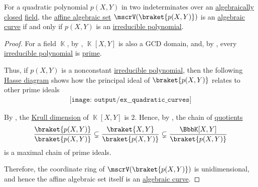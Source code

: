 \begin{proposition}\label{thm:quadratic_polynomial_irreducibility}
  For a quadratic polynomial \( p(X, Y) \) in two indeterminates over an \hyperref[def:algebraically_closed_field]{algebraically closed} \hyperref[def:field]{field}, the \hyperref[def:affine_algebraic_set]{affine algebraic set} \( \mscrV(\braket{ p(X, Y) }) \) is an \hyperref[def:affine_algebraic_set/variety]{algebraic curve} if and only if \( p(X, Y) \) is an \hyperref[def:domain_divisibility/irreducible]{irreducible polynomial}.
\end{proposition}
\begin{proof}
  For a field \( \BbbK \), by , \( \BbbK[X, Y] \) is also a GCD domain, and, by , every \hyperref[def:domain_divisibility/irreducible]{irreducible polynomial} is \hyperref[def:domain_divisibility/prime]{prime}.

  Thus, if \( p(X, Y) \) is a nonconstant \hyperref[def:domain_divisibility/irreducible]{irreducible polynomial}, then the following \hyperref[def:hasse_diagram]{Hasse diagram} shows how the principal ideal of \( \braket{ p(X, Y) } \) relates to other prime ideals
  \begin{equation*}
    \begin{aligned}
      \texttt{[image: output/ex\_\_quadratic\_curves]}
    \end{aligned}
  \end{equation*}

  By , the \hyperref[def:krull_dimension]{Krull dimension} of \( \BbbK[X, Y] \) is \( 2 \). Hence, by , the chain of \hyperref[def:ring/quotient]{quotients}
  \begin{equation*}
    \frac {\braket{ p(X, Y) }} {\braket{ p(X, Y) }} \subsetneq \frac {\braket{ X, Y }} {\braket{ p(X, Y) }} \subsetneq \frac {\BbbK[X, Y]} {\braket{ p(X, Y) }}
  \end{equation*}
  is a maximal chain of prime ideals.

  Therefore, the coordinate ring of \( \mscrV(\braket{ p(X, Y) }) \) is unidimensional, and hence the affine algebraic set itself is an \hyperref[def:affine_algebraic_set/curve]{algebraic curve}.
\end{proof}

